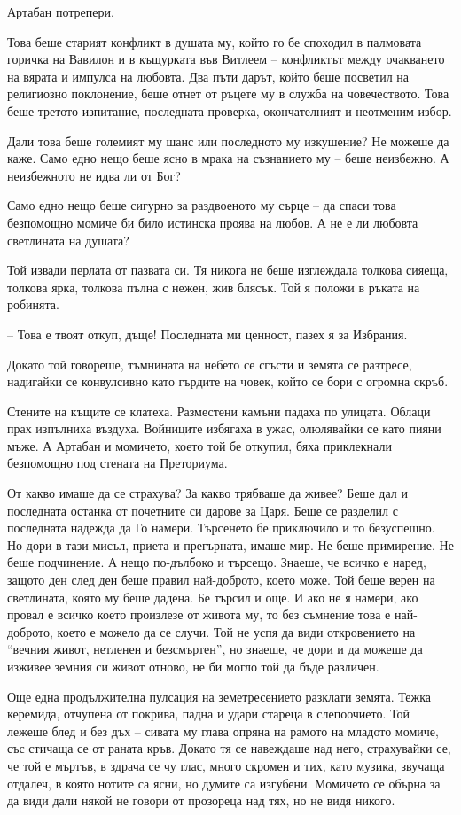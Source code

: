Артабан потрепери.

Това беше старият конфликт в душата му, който го бе споходил в палмовата горичка
на Вавилон и в къщурката във Витлеем -- конфликтът между очакването на вярата и
импулса на любовта. Два пъти дарът, който беше посветил на религиозно
поклонение, беше отнет от ръцете му в служба на човечеството. Това беше третото
изпитание, последната проверка, окончателният и неотменим избор.

Дали това беше големият му шанс или последното му изкушение? Не можеше да каже.
Само едно нещо беше ясно в мрака на съзнанието му -- беше неизбежно. А
неизбежното не идва ли от Бог?

Само едно нещо беше сигурно за раздвоеното му сърце -- да спаси това безпомощно
момиче би било истинска проява на любов. А не е ли любовта светлината на душата?

Той извади перлата от пазвата си. Тя никога не беше изглеждала толкова сияеща,
толкова ярка, толкова пълна с нежен, жив блясък. Той я положи в ръката на
робинята.

-- Това е твоят откуп, дъще! Последната ми ценност, пазех я за Избрания.

Докато той говореше, тъмнината на небето се сгъсти и земята се разтресе,
надигайки се конвулсивно като гърдите на човек, който се бори с огромна скръб.

Стените на къщите се клатеха. Разместени камъни падаха по улицата. Облаци прах
изпълниха въздуха. Войниците избягаха в ужас, олюлявайки се като пияни мъже. А
Артабан и момичето, което той бе откупил, бяха приклекнали безпомощно под
стената на Преториума.

От какво имаше да се страхува? За какво трябваше да живее? Беше дал и последната
останка от почетните си дарове за Царя. Беше се разделил с последната надежда да
Го намери. Търсенето бе приключило и то безуспешно. Но дори в тази мисъл, приета
и прегърната, имаше мир. Не беше примирение. Не беше подчинение. А нещо
по-дълбоко и търсещо. Знаеше, че всичко е наред, защото ден след ден беше правил
най-доброто, което може. Той беше верен на светлината, която му беше дадена. Бе
търсил и още. И ако не я намери, ако провал е всичко което произлезе от живота
му, то без съмнение това е най-доброто, което е можело да се случи. Той не успя
да види откровението на ``вечния живот, нетленен и безсмъртен'', но знаеше, че
дори и да можеше да изживее земния си живот отново, не би могло той да бъде
различен.

Още една продължителна пулсация на земетресението разклати земята. Тежка
керемида, отчупена от покрива, падна и удари стареца в слепоочието. Той лежеше
блед и без дъх -- сивата му глава опряна на рамото на младото момиче, със стичаща
се от раната кръв. Докато тя се навеждаше над него, страхувайки се, че той е
мъртъв, в здрача се чу глас, много скромен и тих, като музика, звучаща отдалеч,
в която нотите са ясни, но думите са изгубени. Момичето се обърна за да види
дали някой не говори от прозореца над тях, но не видя никого.

